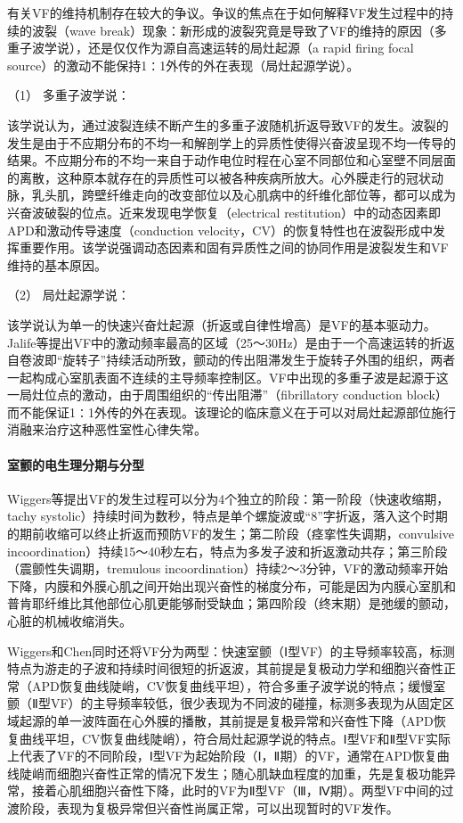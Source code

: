 有关VF的维持机制存在较大的争议。争议的焦点在于如何解释VF发生过程中的持续的波裂（wave
break）现象：新形成的波裂究竟是导致了VF的维持的原因（多重子波学说），还是仅仅作为源自高速运转的局灶起源（a
rapid firing focal
source）的激动不能保持1∶1外传的外在表现（局灶起源学说）。

\hypertarget{text00296.htmlux5cux23CHP10-2-9-1-2-2-1}{}
（1） 多重子波学说：

该学说认为，通过波裂连续不断产生的多重子波随机折返导致VF的发生。波裂的发生是由于不应期分布的不均一和解剖学上的异质性使得兴奋波呈现不均一传导的结果。不应期分布的不均一来自于动作电位时程在心室不同部位和心室壁不同层面的离散，这种原本就存在的异质性可以被各种疾病所放大。心外膜走行的冠状动脉，乳头肌，跨壁纤维走向的改变部位以及心肌病中的纤维化部位等，都可以成为兴奋波破裂的位点。近来发现电学恢复（electrical
restitution）中的动态因素即APD和激动传导速度（conduction
velocity，CV）的恢复特性也在波裂形成中发挥重要作用。该学说强调动态因素和固有异质性之间的协同作用是波裂发生和VF维持的基本原因。

\hypertarget{text00296.htmlux5cux23CHP10-2-9-1-2-2-2}{}
（2） 局灶起源学说：

该学说认为单一的快速兴奋灶起源（折返或自律性增高）是VF的基本驱动力。Jalife等提出VF中的激动频率最高的区域（25～30Hz）是由于一个高速运转的折返自卷波即“旋转子”持续活动所致，颤动的传出阻滞发生于旋转子外围的组织，两者一起构成心室肌表面不连续的主导频率控制区。VF中出现的多重子波是起源于这一局灶位点的激动，由于周围组织的“传出阻滞”（fibrillatory
conduction
block）而不能保证1∶1外传的外在表现。该理论的临床意义在于可以对局灶起源部位施行消融来治疗这种恶性室性心律失常。

\paragraph{室颤的电生理分期与分型}

Wiggers等提出VF的发生过程可以分为4个独立的阶段：第一阶段（快速收缩期，tachy
systolic）持续时间为数秒，特点是单个螺旋波或“8”字折返，落入这个时期的期前收缩可以终止折返而预防VF的发生；第二阶段（痉挛性失调期，convulsive
incoordination）持续15～40秒左右，特点为多发子波和折返激动共存；第三阶段（震颤性失调期，tremulous
incoordination）持续2～3分钟，VF的激动频率开始下降，内膜和外膜心肌之间开始出现兴奋性的梯度分布，可能是因为内膜心室肌和普肯耶纤维比其他部位心肌更能够耐受缺血；第四阶段（终末期）是弛缓的颤动，心脏的机械收缩消失。

Wiggers和Chen同时还将VF分为两型：快速室颤（Ⅰ型VF）的主导频率较高，标测特点为游走的子波和持续时间很短的折返波，其前提是复极动力学和细胞兴奋性正常（APD恢复曲线陡峭，CV恢复曲线平坦），符合多重子波学说的特点；缓慢室颤（Ⅱ型VF）的主导频率较低，很少表现为不同波的碰撞，标测多表现为从固定区域起源的单一波阵面在心外膜的播散，其前提是复极异常和兴奋性下降（APD恢复曲线平坦，CV恢复曲线陡峭），符合局灶起源学说的特点。Ⅰ型VF和Ⅱ型VF实际上代表了VF的不同阶段，Ⅰ型VF为起始阶段（Ⅰ，Ⅱ期）的VF，通常在APD恢复曲线陡峭而细胞兴奋性正常的情况下发生；随心肌缺血程度的加重，先是复极功能异常，接着心肌细胞兴奋性下降，此时的VF为Ⅱ型VF（Ⅲ，Ⅳ期）。两型VF中间的过渡阶段，表现为复极异常但兴奋性尚属正常，可以出现暂时的VF发作。

